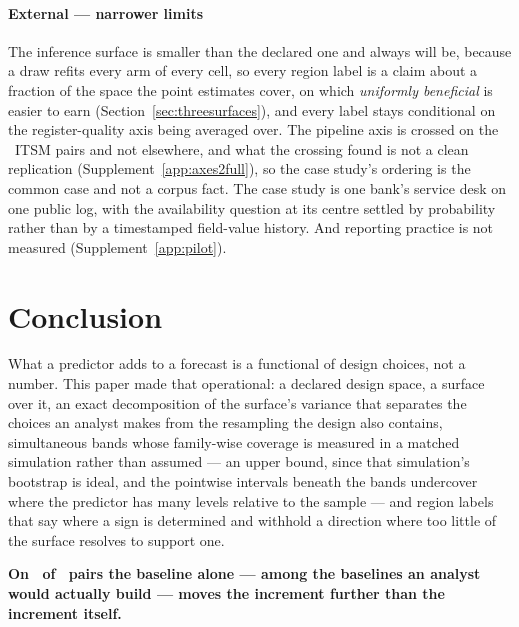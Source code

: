 \documentclass[11pt,3p,review,authoryear]{elsarticle}
\theoremstyle{definition}
\begin{document}
\paragraph{External --- narrower limits}
The inference surface is smaller than the declared one and always will be,
because a draw refits every arm of every cell, so every region label is a
claim about a fraction of the space the point estimates cover, on which
\emph{uniformly beneficial} is easier to earn
(Section~\ref{sec:threesurfaces}), and every label stays conditional on the
register-quality axis being averaged over. The pipeline axis is crossed on the
\nItsmCrossed\ ITSM pairs and not elsewhere, and what the crossing found is
not a clean replication (Supplement~\ref{app:axes2full}), so the case study's
ordering is the common case and not a corpus fact. The case study is one
bank's service desk on one public log, with the availability question at its
centre settled by probability rather than by a timestamped field-value
history. And reporting practice is not measured (Supplement~\ref{app:pilot}).

\section{Conclusion}
\label{sec:conclusion}
\label{sec:conc}

What a predictor adds to a forecast is a functional of design choices, not a
number. This paper made that operational: a declared design space, a surface
over it, an exact decomposition of the surface's variance that separates the
choices an analyst makes from the resampling the design also contains,
simultaneous bands whose family-wise coverage is measured in a matched
simulation rather than assumed --- an upper bound, since that simulation's
bootstrap is ideal, and the pointwise intervals beneath the bands undercover
where the predictor has many levels relative to the sample --- and region
labels that say where a sign is determined and withhold a direction where too
little of the surface resolves to support one.

\textbf{On \nSpreadExceedsRealistic\ of \nPairs\ pairs the baseline alone
--- among the baselines an analyst would actually build --- moves the
increment further than the increment itself.}
\end{document}
